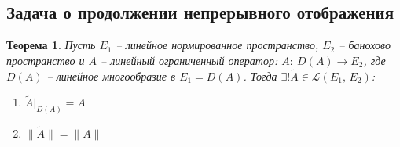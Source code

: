 \documentclass[a4paper,12pt]{article}
\theoremstyle{plain}
\newtheorem{theorem}{Теорема}[section]
\theoremstyle{definition}
\theoremstyle{remark}
\begin{document}
\subsection{Задача о продолжении непрерывного отображения}
\begin{theorem}
	Пусть $E_1$ -- линейное нормированное пространство, $E_2$ -- банохово пространство и $A$ -- линейный ограниченный оператор: $A :\: D(A) \to E_2$, где $D(A)$ -- линейное многообразие в $E_1 = \overline{D(A)}$. Тогда $\exists! \tilde{A} \in \mathcal{L}(E_1,\,E_2)$:
	\begin{enumerate}
		\item $\tilde{A}|_{D(A)} = A$
		\item $\|\tilde{A}\| = \|A\|$
	\end{enumerate}
\end{theorem}
\end{document}
